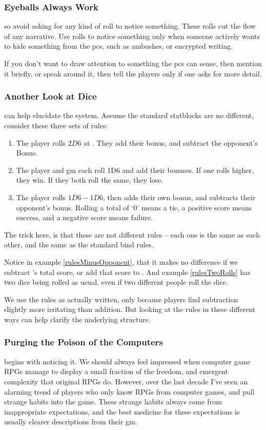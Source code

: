 \begin{multicols}{2}
\subsubsection{Eyeballs Always Work}
so avoid asking for any kind of roll to notice something.
These rolls cut the flow of any narrative.
Use rolls to notice something only when someone actively wants to hide something from the \glspl{pc}, such as ambushes, or encrypted writing.

If you don't want to draw attention to something the \glspl{pc} can sense, then mention it briefly, or speak around it, then tell the players only if one asks for more detail.

\subsubsection{Another Look at Dice}
can help elucidate the system.
Assume the standard statblocks are no different, consider these three sets of rules:

\begin{enumerate}
  \item
  The player rolls $2D6$ at \tn[7].
  They add their bonus, and subtract the opponent's Bonus.
  \label{rulesMinusOpponent}
  \item
  The player and \gls{gm} each roll 1D6 and add their bonuses.
  If one rolls higher, they win.
  If they both roll the same, they lose.
  \label{rulesTwoRolls}
  \item
  The player rolls $1D6-1D6$, then adds their own bonus, and subtracts their opponent's bonus.
  Rolling a total of `0' means a tie, a positive score means success, and a negative score means failure.
  \label{rulesMinusDie}
\end{enumerate}

The trick here, is that these are not different rules -- each one is the same as each other, and the same as the standard \gls{bind} rules.

Notice in example \ref{rulesMinusOpponent}, that it makes no difference if we subtract 's total score, or add that score to .
And example \ref{rulesTwoRolls} has two dice being rolled as usual, even if two different people roll the dice.

We use the rules as actually written, only because players find subtraction slightly more irritating than addition.
But looking at the rules in these different ways can help clarify the underlying structure.

\subsubsection{Purging the Poison of the Computers}
begins with noticing it.
We should always feel impressed when computer game RPGs manage to display a small fraction of the freedom, and emergent complexity that original RPGs do.
However, over the last decade I've seen an alarming trend of players who only know RPGs from computer games, and pull strange habits into the game.
These strange habits always come from inappropriate expectations, and the best medicine for these expectations is usually clearer descriptions from their \gls{gm}.


\end{multicols}
